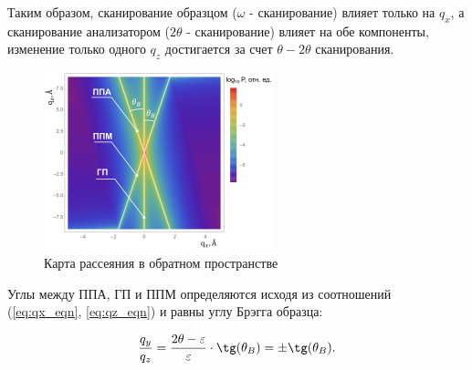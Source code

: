 Таким образом, сканирование образцом ($\omega$ - сканирование) влияет только на $q_x$, а
сканирование анализатором ($2\theta$ - сканирование) влияет на обе компоненты,
 изменение только одного $q_z$ достигается за счет $\theta-2\theta$ сканирования.

\begin{figure}[H]
  \centering
  \includegraphics[width=0.6\textwidth]{images/triple_map_reciprocal_space.png}
  \caption{Карта рассеяния в обратном пространстве}
  \label{ris:triple_map_reciprocal_space}
\end{figure}

Углы между ППА, ГП и ППМ определяются исходя из соотношений (\ref{eq:qx_eqn}, \ref{eq:qz_eqn}) и равны углу Брэгга образца:

\begin{equation}
  \frac{q_y}{q_z} = \frac{2\theta - \varepsilon}{\varepsilon} \cdot \tg (\theta_B) = \pm \tg (\theta_B).
  \label{eq:qz_eqn}
\end{equation}
